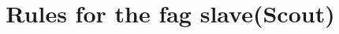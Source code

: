 \documentclass[a4paper,fontset=ubuntu,12pt]{ctexart}
\title{Rules for the fag slave(Scout)}
\begin{document}
\maketitle

\begin{comment}

\begin{itemize}
\item 贱狗存在的唯一意义就是跪在主人脚下用狗嘴伺少爷，贱狗只能用狗嘴伺候少爷的身体和鞋袜， 未经少爷允许，不能用狗爪子帮忙。
\item 贱狗不能用使用“你”，“我”等词汇，必须称呼主人为“爷“，”少爷”；称呼自己为“奴才”，“贱狗”。
\item 贱狗要发自内心地崇拜少爷， 努力伺候少爷让少爷爽，具体表现在：
    \begin{itemize}
        \item 在少爷脚下闻舔鞋袜时保持深呼吸好好感受少爷的脚味，少爷使用贱狗当尿壶时贱狗要仔细闻并品尝圣水，心里要想着自己有多渴望喝到它崇拜的帅主人的尿，贱狗能舔到少爷的脚喝到少爷的尿是贱狗的福气。
        \item 贱狗每次伺候完少爷都要心怀感激地磕头谢恩，边磕头边说“谢谢少爷赏奴才舔少爷的帅脚“，谢谢少爷用龙根草奴才的狗嘴”等。
        \item 贱狗在回答少爷的问话时必须表现出自己的下贱，少爷玩儿到兴头上贱狗要主动求少爷玩儿自己，比如“求少爷赏奴才舔龙根“，”喝圣水”等。贱狗在发骚时必须口齿清晰，不能因为害羞说得很轻或者不说话。要牢记自己就是少爷脚下的一条狗，生下来就是跪求伺候少爷的命。
        \item 用狗嘴伺候少爷时要时刻想着怎么让少爷玩儿得更爽，比如舔少爷的脚趾缝时舔得少爷很爽，贱狗就要记住当时是怎么舔的，这样慢慢提高自己的口活。 贱狗在舔少爷的帅脚和龙根时必须努力用嘴唇包裹住狗牙，以免少爷觉得不适。 在深喉的时候喉咙要不断得吞咽，以便用狗喉咙按摩少爷的龙根。被少爷草嘴草到干呕时也不能怠慢，要确保狗嘴包裹住少爷的龙根。如果做得不好要做好挨少爷揍的准备。
        \item 少爷在揍贱狗出气时贱狗要主动配合，比如主动把脸凑到少爷脚边让少爷踹，被踹后及时爬回少爷脚下等着少爷踹。如果少爷踹累了，贱狗主动磕头谢恩，然后闻舔少爷的鞋袜，舔少爷的脚底来表达对少爷的崇拜，让少爷感受到征服的快感。
    \end{itemize}
\item 贱狗的日常行为规范：
    \begin{itemize}
        \item 早上起床后做早间崇拜，嘴里含着少爷昨天穿过的袜子，脸伸到少爷的球鞋里感受少爷的脚味。 然后给少爷磕头，亲舔少爷的脚底，请少爷下床。
        \item 少爷上厕所时贱狗应该跪在马桶前，听从少爷的命令给少爷磕头，舔龙根，或者舔脚，含着少爷的龙根时贱狗要在马桶前深呼吸，好好地感受少爷的黄金的香味， 并磕头感谢少爷赏贱狗闻黄金。

\end{comment}
\end{document}
